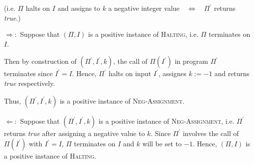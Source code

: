 (i.e. $\Pi $ halts on $I$ and assigns to $k$ a negative integer value$\quad
\Leftrightarrow\quad \Pi^{\prime }$ returns \textit{true}.)

$\Rightarrow :$ Suppose that $\left( \Pi ,I\right) $ is a positive instance
of \textsc{Halting}, i.e. $\Pi $ terminates on $I$.

\noindent Then by construction of $(\Pi ^{\prime },I^{\prime },k)$, the call of $\Pi
(I^{\prime })$ in program $\Pi ^{\prime }$ terminates since $I^{\prime }=I$.
Hence, $\Pi ^{\prime }$ halts on input $I^{\prime }$, assignes $k:=-1$ and
returns \textit{true} respectively.

\noindent Thus, $(\Pi ^{\prime },I^{\prime },k)$ is a positive instance of \textsc{%
Neg-Assignment}.

\bigskip

$\Leftarrow :$ Suppose that $\left( \Pi ^{\prime },I^{\prime },k\right) $ is
a positive instance of \textsc{Neg-Assignment}, i.e. $\Pi ^{\prime }$
returns \textit{true} after assigning a negative value to $k$. Since $\Pi
^{\prime }$ involves the call of $\Pi (I^{\prime })$ with $I^{\prime }=I$, $%
\Pi $ terminates on $I$ and $k$ will be set to $-1$. Hence, $(\Pi ,I)$ is a
positive instance of \textsc{Halting}.

\bigskip
